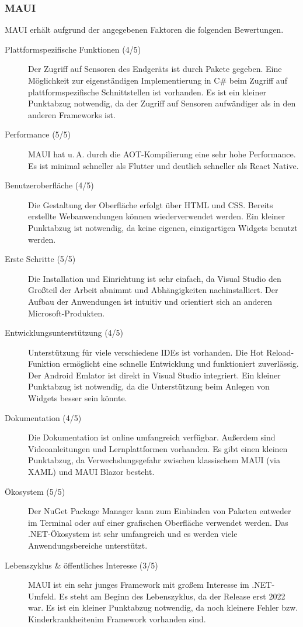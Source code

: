 \documentclass[]{lni}
\begin{document}
\subsubsection{MAUI}
MAUI erhält aufgrund der angegebenen Faktoren die folgenden Bewertungen.
\begin{description}
	\item[Plattformspezifische Funktionen (4/5)] Der Zugriff auf Sensoren des Endgeräts ist durch Pakete gegeben. Eine Möglichkeit zur eigenständigen Implementierung in C\# beim Zugriff auf plattformspezifische Schnittstellen ist vorhanden. Es ist ein kleiner Punktabzug notwendig, da der Zugriff auf Sensoren aufwändiger als in den anderen Frameworks ist.
	\item[Performance (5/5)] MAUI hat u.\,A. durch die AOT-Kompilierung eine sehr hohe Performance. Es ist minimal schneller als Flutter und deutlich schneller als React Native.
	\item[Benutzeroberfläche (4/5)] Die Gestaltung der Oberfläche erfolgt über HTML und CSS. Bereits erstellte Webanwendungen können wiederverwendet werden. Ein kleiner Punktabzug ist notwendig, da keine eigenen, einzigartigen Widgets benutzt werden.
	\item[Erste Schritte (5/5)] Die Installation und Einrichtung ist sehr einfach, da Visual Studio den Großteil der Arbeit abnimmt und Abhängigkeiten nachinstalliert. Der Aufbau der Anwendungen ist intuitiv und orientiert sich an anderen Microsoft-Produkten.
	\item[Entwicklungsunterstützung (4/5)] Unterstützung für viele verschiedene IDEs ist vorhanden. Die Hot Reload-Funktion ermöglicht eine schnelle Entwicklung und funktioniert zuverlässig. Der Android Emlator ist direkt in Visual Studio integriert. Ein kleiner Punktabzug ist notwendig, da die Unterstützung beim Anlegen von Widgets besser sein könnte.
	\item[Dokumentation (4/5)] Die Dokumentation ist online umfangreich verfügbar. Außerdem sind Videoanleitungen und Lernplattformen vorhanden. Es gibt einen kleinen Punktabzug, da Verwechslungsgefahr zwischen klassischem MAUI (via XAML) und MAUI Blazor besteht.
	\item[Ökosystem (5/5)] Der NuGet Package Manager kann zum Einbinden von Paketen entweder im Terminal oder auf einer grafischen Oberfläche verwendet werden. Das .NET-Ökosystem ist sehr umfangreich und es werden viele Anwendungsbereiche unterstützt.
	\item[Lebenszyklus \& öffentliches Interesse (3/5)] MAUI ist ein sehr junges Framework mit großem Interesse im .NET-Umfeld. Es steht am Beginn des Lebenszyklus, da der Release erst 2022 war. Es ist ein kleiner Punktabzug notwendig, da noch kleinere Fehler bzw. \glqq Kinderkrankheiten\grqq\:im Framework vorhanden sind.
\end{description}
\end{document}
